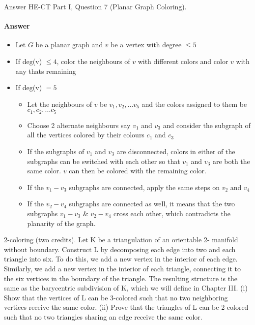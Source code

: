 \documentclass{article}
\begin{document}
Answer HE-CT Part I, Question 7 (Planar Graph Coloring).

\paragraph{Answer}

\begin{itemize}
	\item Let  $G$ be a planar graph and $v$ be a vertex with degree $\leq 5$ 
	\item If deg(v) $\leq 4$, color the neighbours of $v$ with different colors and color $v$ with any thats remaining
	\item If deg(v) $ = 5$ 
	\begin{itemize}
		\item Let the neighbours of $v$ be $v_1,v_2,...v_5$ and the colors assigned to them be $c_1,c_2,...c_5$
		\item Choose 2 alternate neighbours say $v_1$ and $v_3$ and consider the subgraph of all the vertices colored by their colours $c_1$ and $c_3$
		\item If the subgraphs of $v_1$ and $v_3$  are disconnected, colors in either of the subgraphs can be switched with each other so that $v_1$ and $v_3$ are both the same color. $v$ can then be colored with the remaining color.
		\item If the $v_1 - v_3$ subgraphs are connected, apply the same steps on  $v_2$ and $v_4$
		\item If the $v_2 - v_4$ subgraphs are connected as well, it means that the two subgraphs $v_1 - v_3$ \& $v_2 - v_4$  cross each other, which contradicts the planarity of the graph.		 
	\end{itemize}
\end{itemize}


2-coloring (two credits). Let K be a triangulation of an orientable 2-
manifold without boundary. Construct L by decomposing each edge into
two and each triangle into six. To do this, we add a new vertex in the
interior of each edge. Similarly, we add a new vertex in the interior of each
triangle, connecting it to the six vertices in the boundary of the triangle.
The resulting structure is the same as the barycentric subdivision of K,
which we will define in Chapter III.
(i) Show that the vertices of L can be 3-colored such that no two neighboring
vertices receive the same color.
(ii) Prove that the triangles of L can be 2-colored such that no two triangles
sharing an edge receive the same color.
\end{document}
